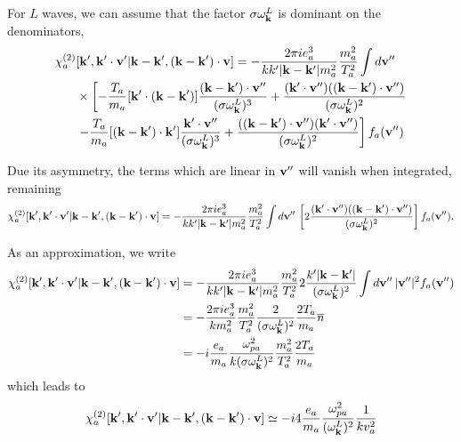 \documentclass[12pt,a4paper,ruledheader]{report}
\begin{document}
\begin{appendix}
For $L$ waves, we can assume that the factor $\sigma\omega_{\bf k}^L$ is 
dominant on the denominators,
\begin{equation}
  \begin{split}
    \chi_a^{(2)}&[{\bf k'},{\bf k'\cdot v'}|{\bf k-k'},({\bf k-k'})\cdot{\bf v}]
    =-\frac{2\pi ie_a^3}{k k'|{\bf k-k'}|m_a^2}\frac{m_a^2}{T_a^2}\int d{\bf v''}\\
    &\times\left[-\frac{T_a}{m_a}[{\bf k'}\cdot({\bf k-k'})]
      \frac{({\bf k-k'})\cdot{\bf v''}}
      {(\sigma\omega_{\bf k}^L)^3}+ \frac{({\bf k'}\cdot{\bf v''})
        (({\bf k-k'})\cdot{\bf v''})}
      {(\sigma\omega_{\bf k}^L)^2} \right.\\
    &\left. -\frac{T_a}{m_a} [({\bf k-k'})\cdot {\bf k'}]
      \frac{{\bf k'}\cdot{\bf v''}}
      {(\sigma\omega_{\bf k}^L)^3}
      + \frac{(({\bf k-k'})\cdot{\bf v''})
        ({\bf k'}\cdot{\bf v''})}
      {(\sigma\omega_{\bf k}^L)^2}
    \right] f_a({\bf v''})
    \label{dom-freq}
  \end{split}
\end{equation}

Due its asymmetry, the terms which are linear in ${\bf v''}$ will vanish
when integrated, remaining
\begin{equation}
\begin{split}
\chi_a^{(2)}[{\bf k'},{\bf k'\cdot v'}|{\bf k-k'},({\bf k-k'})\cdot{\bf v}]
=-\frac{2\pi ie_a^3}{k k'|{\bf k-k'}|m_a^2}\frac{m_a^2}{T_a^2}
\int d{\bf v''}\,\left[2\frac{({\bf k'}\cdot{\bf v''})
(({\bf k-k'})\cdot{\bf v''})}
{(\sigma\omega_{\bf k}^L)^2} 
\right] f_a({\bf v''}).
\end{split}
\end{equation}

As an approximation, we write
\begin{equation}
\begin{split}
\chi_a^{(2)}[{\bf k'},{\bf k'\cdot v'}|{\bf k-k'},({\bf k-k'})\cdot{\bf v}]
&=-\frac{2\pi ie_a^3}{k k'|{\bf k-k'}|m_a^2}\frac{m_a^2}{T_a^2}
2\frac{k'|{\bf k-k'}|}{(\sigma\omega_{\bf k}^L)^2} 
\int d{\bf v''}\,|{\bf v''}|^2 f_a({\bf v''})\\
&=-\frac{2\pi ie_a^3}{k m_a^2}\frac{m_a^2}{T_a^2}
\frac{2}{(\sigma\omega_{\bf k}^L)^2} \frac{2T_a}{m_a}\overline{n}\\
&=-i\frac{e_a}{m_a}\frac{\omega_{pa}^2}{k(\sigma\omega_{\bf k}^L)^2} 
\frac{m_a^2}{T_a^2}\frac{2T_a}{m_a}\nonumber
\end{split}
\end{equation}
which leads to
\begin{equation}
\label{chi2,3}
\chi_a^{(2)}[{\bf k'},{\bf k'\cdot v'}|{\bf k-k'},({\bf k-k'})\cdot{\bf v}]
\simeq -i4\frac{e_a}{m_a}\frac{\omega_{pa}^2}{(\omega_{\bf k}^L)^2} 
\frac{1}{kv_{a}^2}
\end{equation}


\end{appendix}
\end{document}
